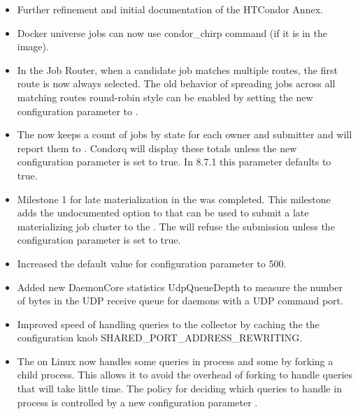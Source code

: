 \begin{itemize}
\item Further refinement and initial documentation of the HTCondor Annex.

\item Docker universe jobs can now use condor\_chirp command
(if it is in the image).

\item In the Job Router, when a candidate job matches multiple routes,
the first route is now always selected.
The old behavior of spreading jobs across all matching routes round-robin
style can be enabled by setting the new configuration parameter
 to .

\item The  now keeps a count of jobs by state for each owner and submitter
and will report them to . Condor{q} will display these totals unless the new
configuration parameter  is set to true. In 8.7.1
this parameter defaults to true.

\item Milestone 1 for late materialization in the  was completed. This milestone adds the
undocumented option  to  that can be used to submit a late materializing job cluster
to the .  The  will refuse the submission unless the configuration parameter
 is set to true.

\item Increased the default value for configuration parameter
 to 500.

\item Added new DaemonCore statistics UdpQueueDepth to measure the
number of bytes in the UDP receive queue for daemons with a UDP command port.

\item Improved speed of handling queries to the collector by caching the
the configuration knob SHARED\_PORT\_ADDRESS\_REWRITING.

\item The  on Linux now handles some queries in process and some
by forking a child process. This allows it to avoid the overhead of forking to handle
queries that will take little time. The policy for deciding which queries to handle in process
is controlled by a new configuration parameter .


\end{itemize}
